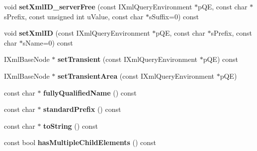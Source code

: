 \begin{DoxyCompactItemize}
\item 
\hypertarget{classgeneral__server_1_1XmlBaseNode_ab8f6474dab1cf71ab43d1d97a8af3aa3}{void {\bfseries set\-Xml\-I\-D\-\_\-server\-Free} (const \-I\-Xml\-Query\-Environment $\ast$p\-Q\-E, const char $\ast$s\-Prefix, const unsigned int u\-Value, const char $\ast$s\-Suffix=0) const }\label{classgeneral__server_1_1XmlBaseNode_ab8f6474dab1cf71ab43d1d97a8af3aa3}

\item 
\hypertarget{classgeneral__server_1_1XmlBaseNode_a04d8232e3b10a6d8e403c12a9afdbbe6}{void {\bfseries set\-Xml\-I\-D} (const \-I\-Xml\-Query\-Environment $\ast$p\-Q\-E, const char $\ast$s\-Prefix, const char $\ast$s\-Name=0) const }\label{classgeneral__server_1_1XmlBaseNode_a04d8232e3b10a6d8e403c12a9afdbbe6}

\item 
\hypertarget{classgeneral__server_1_1XmlBaseNode_a186ca910013059362a410564be9f4a56}{\-I\-Xml\-Base\-Node $\ast$ {\bfseries set\-Transient} (const \-I\-Xml\-Query\-Environment $\ast$p\-Q\-E) const }\label{classgeneral__server_1_1XmlBaseNode_a186ca910013059362a410564be9f4a56}

\item 
\hypertarget{classgeneral__server_1_1XmlBaseNode_a0943f988212da0f524efa72b8d4689ca}{\-I\-Xml\-Base\-Node $\ast$ {\bfseries set\-Transient\-Area} (const \-I\-Xml\-Query\-Environment $\ast$p\-Q\-E)}\label{classgeneral__server_1_1XmlBaseNode_a0943f988212da0f524efa72b8d4689ca}

\item 
\hypertarget{classgeneral__server_1_1XmlBaseNode_a2714ab10df0470c01aa50d7ec969448f}{const char $\ast$ {\bfseries fully\-Qualified\-Name} () const }\label{classgeneral__server_1_1XmlBaseNode_a2714ab10df0470c01aa50d7ec969448f}

\item 
\hypertarget{classgeneral__server_1_1XmlBaseNode_a27732dfe72ad53e741529826060a963f}{const char $\ast$ {\bfseries standard\-Prefix} () const }\label{classgeneral__server_1_1XmlBaseNode_a27732dfe72ad53e741529826060a963f}

\item 
\hypertarget{classgeneral__server_1_1XmlBaseNode_afb3322c297a442234dbbb312282fb9ee}{const char $\ast$ {\bfseries to\-String} () const }\label{classgeneral__server_1_1XmlBaseNode_afb3322c297a442234dbbb312282fb9ee}

\item 
\hypertarget{classgeneral__server_1_1XmlBaseNode_acb728bcb1b83c0cd1cd19e92198e3760}{const bool {\bfseries has\-Multiple\-Child\-Elements} () const }\label{classgeneral__server_1_1XmlBaseNode_acb728bcb1b83c0cd1cd19e92198e3760}


\end{DoxyCompactItemize}
